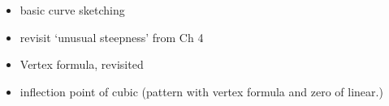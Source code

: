 \label{ExercisesforAppDerivatives}

\begin{itemize}
\item basic curve sketching
\item revisit `unusual steepness' from Ch 4
\item  Vertex formula, revisited
\item  inflection point of cubic (pattern with vertex formula and zero of linear.)
\end{itemize}